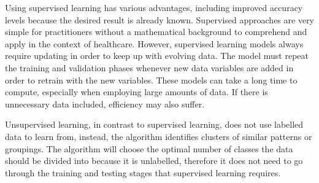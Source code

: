 \documentclass[../thesis.tex]{subfiles}
\begin{document}
\begin{table}[h!]
    \centering{}
    \caption{Supervised Learning Methods}
    \label{tab:supervised}
\end{table}

Using supervised learning has various advantages, including improved accuracy levels because the desired result is already known. Supervised approaches are very simple for practitioners without a mathematical background to comprehend and apply in the context of healthcare. However, supervised learning models always require updating in order to keep up with evolving data. The model must repeat the training and validation phases whenever new data variables are added in order to retrain with the new variables. These models can take a long time to compute, especially when employing large amounts of data. If there is unnecessary data included, efficiency may also suffer.

Unsupervised learning, in contrast to supervised learning, does not use labelled data to learn from, instead, the algorithm identifies clusters of similar patterns or groupings. The algorithm will choose the optimal number of classes the data should be divided into because it is unlabelled, therefore it does not need to go through the training and testing stages that supervised learning requires.
\end{document}
